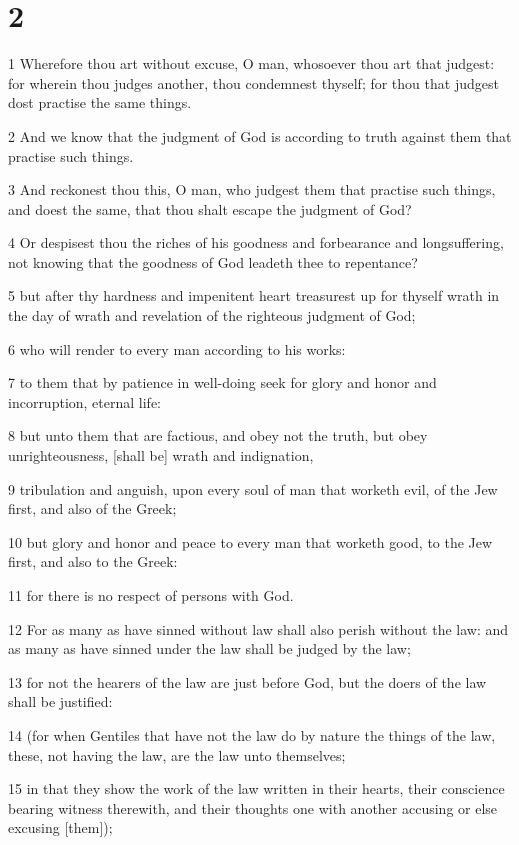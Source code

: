 \chapter{2}

\par 1 Wherefore thou art without excuse, O man, whosoever thou art that judgest: for wherein thou judges another, thou condemnest thyself; for thou that judgest dost practise the same things.
\par 2 And we know that the judgment of God is according to truth against them that practise such things.
\par 3 And reckonest thou this, O man, who judgest them that practise such things, and doest the same, that thou shalt escape the judgment of God?
\par 4 Or despisest thou the riches of his goodness and forbearance and longsuffering, not knowing that the goodness of God leadeth thee to repentance?
\par 5 but after thy hardness and impenitent heart treasurest up for thyself wrath in the day of wrath and revelation of the righteous judgment of God;
\par 6 who will render to every man according to his works:
\par 7 to them that by patience in well-doing seek for glory and honor and incorruption, eternal life:
\par 8 but unto them that are factious, and obey not the truth, but obey unrighteousness, [shall be] wrath and indignation,
\par 9 tribulation and anguish, upon every soul of man that worketh evil, of the Jew first, and also of the Greek;
\par 10 but glory and honor and peace to every man that worketh good, to the Jew first, and also to the Greek:
\par 11 for there is no respect of persons with God.
\par 12 For as many as have sinned without law shall also perish without the law: and as many as have sinned under the law shall be judged by the law;
\par 13 for not the hearers of the law are just before God, but the doers of the law shall be justified:
\par 14 (for when Gentiles that have not the law do by nature the things of the law, these, not having the law, are the law unto themselves;
\par 15 in that they show the work of the law written in their hearts, their conscience bearing witness therewith, and their thoughts one with another accusing or else excusing [them]);
